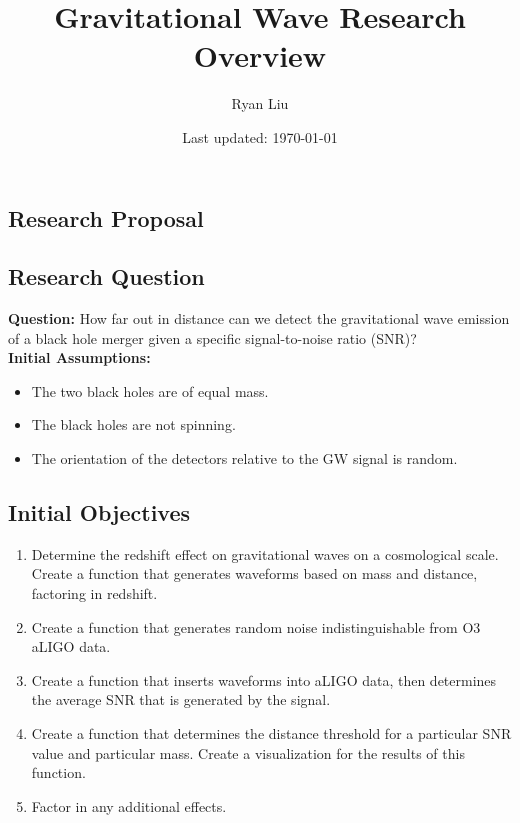 \documentclass[10pt]{article}
\title{Gravitational Wave Research Overview}
\author{Ryan Liu}
\date{Last updated: \today}
\begin{document}
\maketitle

\begin{multicols*}{2}


\section{Research Proposal}

\subsection{Research Question}

\textbf{Question:} How far out in distance can we detect the gravitational wave emission of a black hole merger given a specific signal-to-noise ratio (SNR)? \\

\textbf{Initial Assumptions:}
\begin{itemize}
    \setlength\itemsep{0pt}
    \item The two black holes are of equal mass.
    \item The black holes are not spinning.
    \item The orientation of the detectors relative to the GW signal is random. 
\end{itemize}

\subsection{Initial Objectives}

\begin{enumerate}
    \item Determine the redshift effect on gravitational waves on a cosmological scale. Create a function that generates waveforms based on mass and distance, factoring in redshift. 
    \item Create a function that generates random noise indistinguishable from O3 aLIGO data. 
    \item Create a function that inserts waveforms into aLIGO data, then determines the average SNR that is generated by the signal. 
    \item Create a function that determines the distance threshold for a particular SNR value and particular mass. Create a visualization for the results of this function. 
    \item Factor in any additional effects. 
\end{enumerate}


\end{multicols*}
\end{document}
